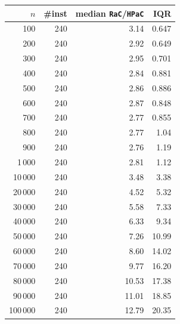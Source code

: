 \begin{tabular}{@{}rrrr@{}}
\toprule
$n$ & \#inst & median \texttt{RaC}/\texttt{HPaC} & IQR \\
\midrule
100 & 240 & 3.14 & 0.647 \\
200 & 240 & 2.92 & 0.649 \\
300 & 240 & 2.95 & 0.701 \\
400 & 240 & 2.84 & 0.881 \\
500 & 240 & 2.86 & 0.886 \\
600 & 240 & 2.87 & 0.848 \\
700 & 240 & 2.77 & 0.855 \\
800 & 240 & 2.77 & 1.04 \\
900 & 240 & 2.76 & 1.19 \\
1\,000 & 240 & 2.81 & 1.12 \\
10\,000 & 240 & 3.48 & 3.38 \\
20\,000 & 240 & 4.52 & 5.32 \\
30\,000 & 240 & 5.58 & 7.33 \\
40\,000 & 240 & 6.33 & 9.34 \\
50\,000 & 240 & 7.26 & 10.99 \\
60\,000 & 240 & 8.60 & 14.02 \\
70\,000 & 240 & 9.77 & 16.20 \\
80\,000 & 240 & 10.53 & 17.38 \\
90\,000 & 240 & 11.01 & 18.85 \\
100\,000 & 240 & 12.79 & 20.35 \\
\bottomrule
\end{tabular}
